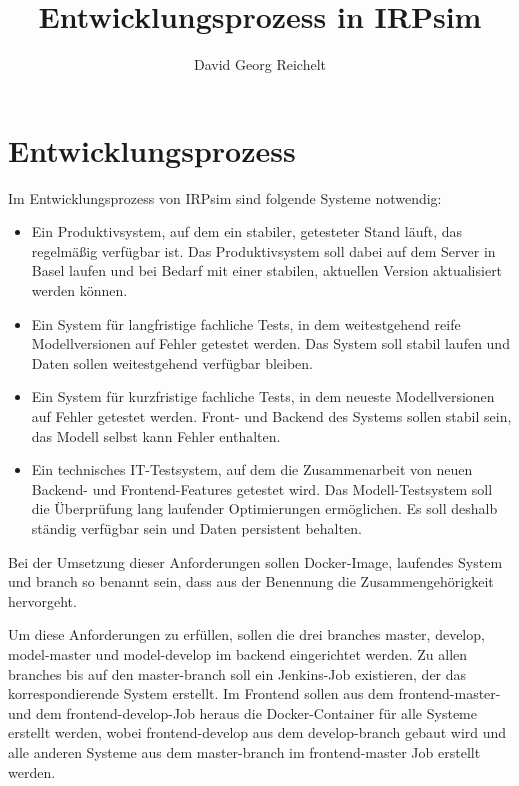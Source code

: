\documentclass[10pt]{scrartcl}
\author{David Georg Reichelt}
\title{Entwicklungsprozess in IRPsim}
\begin{document}

\section{Entwicklungsprozess}

Im Entwicklungsprozess von IRPsim sind folgende Systeme notwendig:

\begin{itemize}
  \item Ein Produktivsystem, auf dem ein stabiler, getesteter Stand läuft, das regelmäßig verfügbar ist. Das Produktivsystem soll dabei auf dem Server in Basel laufen und bei Bedarf mit einer stabilen, aktuellen Version aktualisiert werden können. 
  \item Ein System für langfristige fachliche Tests, in dem weitestgehend reife Modellversionen auf Fehler getestet werden. Das System soll stabil laufen und Daten sollen weitestgehend verfügbar bleiben.
  \item Ein System für kurzfristige fachliche Tests, in dem neueste Modellversionen auf Fehler getestet werden. Front- und Backend des Systems sollen stabil sein, das Modell selbst kann Fehler enthalten.
  \item Ein technisches IT-Testsystem, auf dem die Zusammenarbeit von neuen Backend- und Frontend-Features getestet wird. Das Modell-Testsystem soll die Überprüfung lang laufender Optimierungen ermöglichen. Es soll deshalb ständig verfügbar sein und Daten persistent behalten.
\end{itemize}

Bei der Umsetzung dieser Anforderungen sollen Docker-Image, laufendes System und branch so benannt sein, dass aus der Benennung die Zusammengehörigkeit hervorgeht. 

Um diese Anforderungen zu erfüllen, sollen die drei branches master, develop, model-master und model-develop im backend eingerichtet werden. Zu allen branches bis auf den master-branch soll ein Jenkins-Job existieren, der das korrespondierende System erstellt. Im Frontend sollen aus dem frontend-master- und dem frontend-develop-Job heraus die Docker-Container für alle Systeme erstellt werden, wobei frontend-develop aus dem develop-branch gebaut wird und alle anderen Systeme aus dem master-branch im frontend-master Job erstellt werden.
\end{document}

